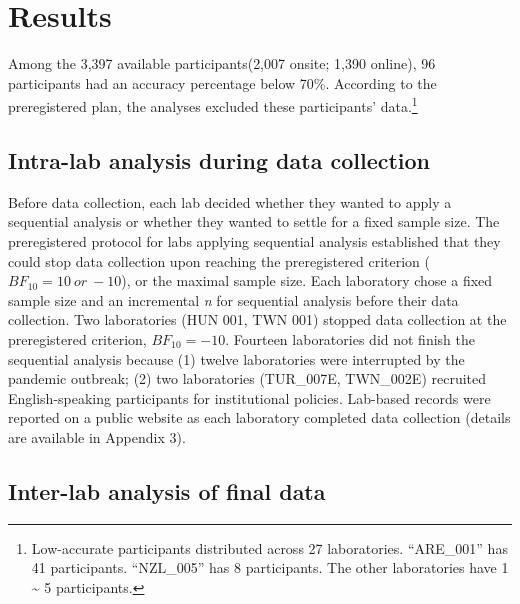 \documentclass[
  man,floatsintext]{apa6}
\begin{document}
\hypertarget{results}{%
\section{Results}\label{results}}

Among the 3,397 available participants(2,007 onsite; 1,390 online), 96 participants had an accuracy percentage below 70\%. According to the preregistered plan, the analyses excluded these participants' data.\footnote{Low-accurate participants distributed across 27 laboratories. ``ARE\_001'' has 41 participants. ``NZL\_005'' has 8 participants. The other laboratories have 1 \textasciitilde{} 5 participants.}

\hypertarget{intra-lab-analysis-during-data-collection}{%
\subsection{Intra-lab analysis during data collection}\label{intra-lab-analysis-during-data-collection}}

Before data collection, each lab decided whether they wanted to apply a sequential analysis \autocite{schonbrodtSequentialHypothesisTesting2017} or whether they wanted to settle for a fixed sample size. The preregistered protocol for labs applying sequential analysis established that they could stop data collection upon reaching the preregistered criterion (\(BF_{10} = 10\ or\ -10\)), or the maximal sample size. Each laboratory chose a fixed sample size and an incremental \emph{n} for sequential analysis before their data collection. Two laboratories (HUN 001, TWN 001) stopped data collection at the preregistered criterion, \(BF_{10} = -10\). Fourteen laboratories did not finish the sequential analysis because (1) twelve laboratories were interrupted by the pandemic outbreak; (2) two laboratories (TUR\_007E, TWN\_002E) recruited English-speaking participants for institutional policies. Lab-based records were reported on a public website as each laboratory completed data collection (details are available in Appendix 3).

\hypertarget{inter-lab-analysis-of-final-data}{%
\subsection{Inter-lab analysis of final data}\label{inter-lab-analysis-of-final-data}}
\end{document}
